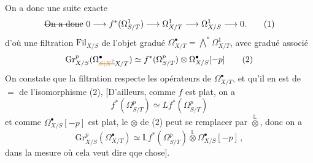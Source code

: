 
On a donc une suite exacte
\[
 \deleted{\text{On a donc}}\ 0\longrightarrow f^*(\Omega^1_{S/T})\longrightarrow\Omega^1_{X/T}\longrightarrow\Omega^1_{X/S}\longrightarrow0 . \tag*{(1)}
\]
d'où une filtration $\mathrm{Fil}_{X/S}$ de l'objet gradué $\Omega^\bullet_{X/T}=\bigwedge^{*}\Omega^1_{X/T}$, avec gradué associé
\[
 \mathrm{Gr}^p_{X/S}(\Omega^\bullet_{\deleted{\unsure{S|X}}X/T})\simeq f^*(\Omega^p_{S/T})\otimes\Omega^\bullet_{X/S}[-p] \tag*{(2)}
\]
On constate que la filtration respecte les opérateurs  de $\Omega^\bullet_{X/T}$, et qu'il en est de $=$ de l'isomorphisme (2),  [D'ailleurs, comme $f$ est plat, on a
\[
 f^*(\Omega^p_{S/T})\simeq Lf^*(\Omega^p_{S/T})
\]
et comme $\Omega^\bullet_{X/S}[-p]$ est plat, le $\otimes$ de (2) peut se remplacer par $\overset{\mathbb L}{\otimes}$, donc on a
\[
 \mathrm{Gr}^p_{X/S}(\Omega^\bullet_{X/T})\simeq\mathbb L f^*(\Omega^p_{S/T})\overset{\mathbb L}{\otimes}\Omega^\bullet_{X/S}[-p] \,, \tag*{(2$'$)}
\]
dans la mesure où cela veut dire qqe chose].

